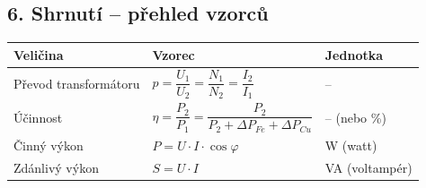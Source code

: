 \documentclass[a4paper,10pt]{article}
\begin{document}
\begin{vysvetlenibox}
\subsection*{6. Shrnutí – přehled vzorců}

\begin{center}
\begin{tabularx}{0.97\linewidth}{@{} l l l @{}}
\toprule
\textbf{Veličina} & \textbf{Vzorec} & \textbf{Jednotka} \\
\midrule
Převod transformátoru & $p = \dfrac{U_1}{U_2} = \dfrac{N_1}{N_2} = \dfrac{I_2}{I_1}$ & -- \\
Účinnost & $\eta = \dfrac{P_2}{P_1} = \dfrac{P_2}{P_2 + \Delta P_{Fe} + \Delta P_{Cu}}$ & -- (nebo \%) \\
Činný výkon & $P = U \cdot I \cdot \cos \varphi$ & W (watt) \\
Zdánlivý výkon & $S = U \cdot I$ & VA (voltampér) \\
\bottomrule
\end{tabularx}
\end{center}

\end{vysvetlenibox}
\end{document}
